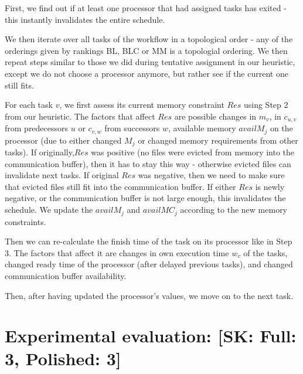 \documentclass[conference]{IEEEtran}
\newcommand{\skug}[1]{{\color{blue}[SK: #1]}}
\newcommand{\hmey}[1]{{\color{red}[HM: #1]}}
\begin{document}
    First, we find out if at least one processor that had assigned tasks has exited - this instantly invalidates the
    entire schedule.

    We then iterate over all tasks of the workflow in a topological order - any of the orderings given by rankings BL, BLC or MM
    is a topologial ordering.
    We then repeat steps similar to those we did during tentative assignment in our heuristic, except we do not choose a processor
    anymore, but rather see if the current one still fits.

    For each task $v$, we first assess its current memory constraint $Res$ using Step 2 from our heuristic.
    The factors that affect $Res$ are possible changes in $m_v$, in $c_{u,v}$ from predecessors $u$ or $c_{v,w}$ from successors $w$,
    available memory $availM_j$ on the processor (due to either changed $M_j$ or changed memory requirements from other tasks).
    If originally,$Res$ was positive (no files were evicted from memory into the communication buffer), then it has to stay this way -
    otherwise evicted files can invalidate next tasks.
    If original $Res$ was negative, then we need to make sure that evicted files still fit into the communication buffer.
    If either $Res$ is newly negative, or the communication buffer is not large enough, this invalidates the schedule.
    We update the $availM_j$ and $availMC_j$ according to the new memory constraints.

    Then we can re-calculate the finish time of the task on its processor like in Step 3.
    The factors that affect it are changes in own execution time $w_v$ of the tasks, changed ready time of the processor
    (after delayed previous tasks), and changed communication buffer availability.

    Then, after having updated the processor's values, we move on to the next task.



    \section{Experimental evaluation: \skug{Full: 3, Polished: 3}}
\end{document}
